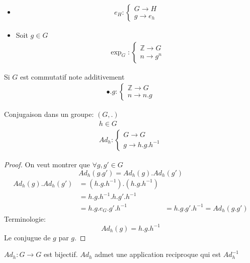 \documentclass[../main.tex]{subfiles}
\begin{document}
\begin{exemple}
\begin{itemize}
\item 
	\begin{align*}
	e_H:
	\begin{cases}
	G\to H\\
	g \to e_h
	\end{cases}
	\end{align*}
	
\item Soit $g\in G$ 
	\begin{align*}
	\exp_G: 
	\begin{cases}
	\mathbb{Z} \to G\\
	n\to g^{n}
	\end{cases}
	\end{align*}
\end{itemize}
\item Si $G$ est commutatif note additivement
	\begin{align*}
	\bullet . g:
	\begin{cases}
	\mathbb{Z} \to G\\
	n \to n.g
	\end{cases}
	\end{align*}

\item Conjugaison dans un groupe: $(G, .)$
	\begin{align*}
	h \in G\\
	Ad_h: 
	\begin{cases}
	G \to G\\
	g\to h.g.h^{-1}
	\end{cases}
	\end{align*}
	\begin{proof}
	On veut montrer que $\forall g,g' \in G$ 
	\[ 
		Ad_h(g.g') = Ad_h(g).Ad_h(g')
	\]
	\begin{align*}
		Ad_h(g).Ad_h(g') &= (h.g.h^{-1} ). ( h.g.h^{-1})\\
				 &= h.g.h^{-1}.h.g'.h^{-1}\\
				 &= h.g.e_G.g'.h^{-1}
				 &= h.g.g'.h^{-1}  = Ad_h(g.g')
	\end{align*}
	Terminologie:\\
	\[ 
		Ad_h(g) = h.g.h^{-1} 	
	\]
	Le conjugue de $g$ par $g$.
	
	
	
	\end{proof}
\end{exemple}
\begin{rmq}
$Ad_h:G\to G$ est bijectif.
$Ad_h$ admet une application reciproque qui est $Ad_h^{-1}$
\end{rmq}
\end{document}
